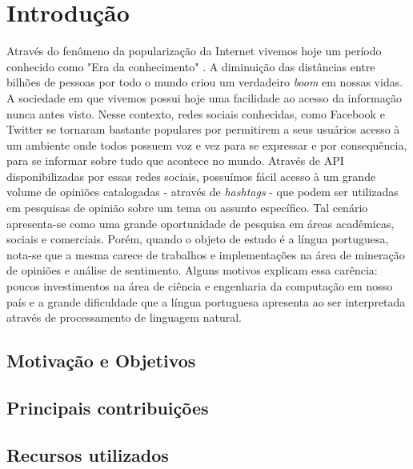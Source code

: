 \chapter{Introdução} \label{cap:1}

Através do fenômeno da popularização da Internet vivemos hoje um período conhecido como "Era da conhecimento" \cite{lastres1999informaccao}. A diminuição das distâncias entre bilhões de pessoas por todo o mundo criou um verdadeiro \textit{boom} em nossas vidas. A sociedade em que vivemos possui hoje uma facilidade ao acesso da informação nunca antes visto. 
Nesse contexto, redes sociais conhecidas, como Facebook e Twitter se tornaram bastante populares por permitirem a seus usuários acesso à um ambiente onde todos possuem voz e vez para se expressar e por consequência, para se informar sobre tudo que acontece no mundo.
Através de \ac{API} disponibilizadas por essas redes sociais, possuímos fácil acesso à um grande volume de opiniões catalogadas - através de \textit{hashtags} - que podem ser utilizadas em pesquisas de opinião sobre um tema ou assunto específico. Tal cenário apresenta-se como uma grande oportunidade de pesquisa em áreas acadêmicas, sociais e comerciais.
Porém, quando o objeto de estudo é a língua portuguesa, nota-se que a mesma carece de trabalhos e implementações na área de mineração de opiniões e análise de sentimento. Alguns motivos explicam essa carência: poucos investimentos na área de ciência e engenharia da computação em nosso país e a grande dificuldade que a língua portuguesa apresenta ao ser interpretada através de processamento de linguagem natural. \cite{santos2000projecto}


\section{Motivação e Objetivos}\label{sec:1_inicio}



\section{Principais contribuições}\label{sec:1_principais_contribuicoes}

\section{Recursos utilizados}\label{sec:1_recursos_utilizados}

